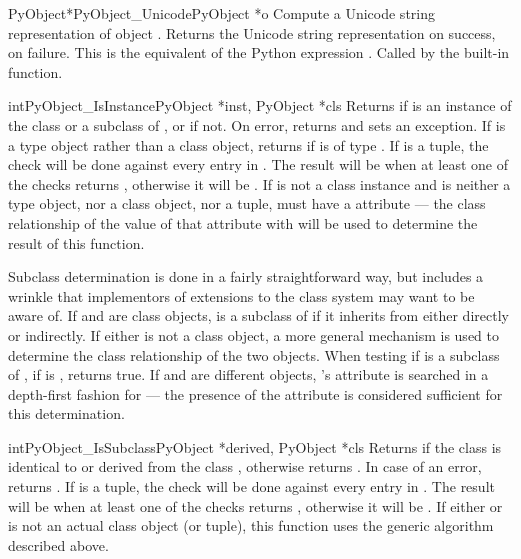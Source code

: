 \begin{cfuncdesc}{PyObject*}{PyObject_Unicode}{PyObject *o}
  Compute a Unicode string representation of object .  Returns
  the Unicode string representation on success, \NULL{} on failure.
  This is the equivalent of the Python expression
  .  Called by the
   built-in function.
\end{cfuncdesc}

\begin{cfuncdesc}{int}{PyObject_IsInstance}{PyObject *inst, PyObject *cls}
  Returns  if  is an instance of the class 
  or a subclass of , or  if not.  On error, returns
   and sets an exception.  If  is a type object
  rather than a class object, 
  returns  if  is of type .  If 
  is a tuple, the check will be done against every entry in .
  The result will be  when at least one of the checks returns
  , otherwise it will be . If  is not a class
  instance and  is neither a type object, nor a class object,
  nor a tuple,  must have a  attribute
  --- the class relationship of the value of that attribute with
   will be used to determine the result of this function.
\end{cfuncdesc}

Subclass determination is done in a fairly straightforward way, but
includes a wrinkle that implementors of extensions to the class system
may want to be aware of.  If  and  are class
objects,  is a subclass of  if it inherits from
 either directly or indirectly.  If either is not a class
object, a more general mechanism is used to determine the class
relationship of the two objects.  When testing if  is a
subclass of , if  is ,
 returns true.  If  and
 are different objects, 's  attribute
is searched in a depth-first fashion for  --- the presence of
the  attribute is considered sufficient for this
determination.

\begin{cfuncdesc}{int}{PyObject_IsSubclass}{PyObject *derived,
                                            PyObject *cls}
  Returns  if the class  is identical to or
  derived from the class , otherwise returns .  In
  case of an error, returns . If 
  is a tuple, the check will be done against every entry in .
  The result will be  when at least one of the checks returns
  , otherwise it will be . If either  or
   is not an actual class object (or tuple), this function
  uses the generic algorithm described above.
\end{cfuncdesc}


